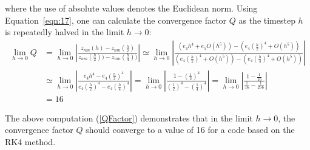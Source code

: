 \documentclass[aps,onecolumn,notitlepage,eqsecnum,nofootinbib,floatfix,superscriptaddress]{revtex4-1}
\begin{document}
\noindent where the use of absolute values denotes the Euclidean norm. Using Equation~\ref{eqn:17}, one can calculate the convergence factor $Q$ as the timestep $h$ is repeatedly halved in the limit $ h \rightarrow 0$:
\begin{equation} \label{QFactor}
\begin{aligned}
  \lim_{h \rightarrow 0}Q&= \lim_{h \rightarrow 0}\left|\frac{z_{nm}(h)- z_{nm}(\frac{h}{2})}{z_{nm}(\frac{h}{2}))- z_{nm}(\frac{h}{4}))}\right|  \simeq \lim_{h \rightarrow 0}\left|\frac{(e_{4}h^{4}+ {e_5}{O}(h^5))- (e_{4}(\frac{h}{2})^{4}+ O(h^5))}{(e_{4}(\frac{h}{2})^{4}+ O(h^5))- (e_{4}(\frac{h}{4})^{4}+ O(h^5))}\right|  \\
&\simeq \lim_{h \rightarrow 0}\left|\frac{e_{4}h^{4}- e_{4}(\frac{h}{2})^{4}}{e_{4}(\frac{h}{2})^{4}- e_{4}(\frac{h}{4})^{4}}\right|= \lim_{h \rightarrow 0}\left|\frac{1- (\frac{1}{2})^{4}}{(\frac{1}{2})^{4}- (\frac{1}{4})^{4}}\right| = \lim_{h \rightarrow 0}\left|\frac{1- \frac{1}{16}}{\frac{1}{16}- \frac{1}{256}}\right|\\
&= 16 
\end{aligned}
\end{equation}

\noindent The above computation (\ref{QFactor}) demonstrates that in the limit $h\rightarrow 0$, the convergence factor $Q$ should converge to a value of 16 for a code based on the RK4 method.
\end{document}
